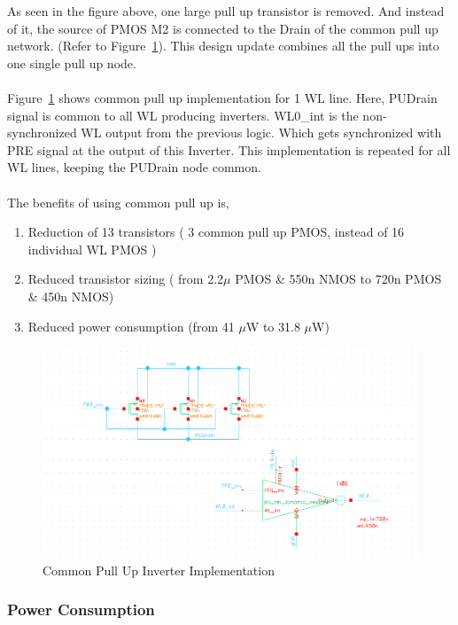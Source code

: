 \documentclass[10pt,letterpaper,onecolumn]{article}
\begin{document}
As seen in the figure above, one large pull up transistor is removed. And instead of it, the source of PMOS M2 is connected to the Drain of the common pull up network. (Refer to Figure~\ref{fig:RevDynamicCircuit}).  This design update combines all the pull ups into one single pull up node. \\ \\  Figure~\ref{fig:RevDynamicCircuit} shows common pull up implementation for 1 WL line. Here, PUDrain signal is common to all WL producing inverters. WL0\_int is the non-synchronized WL output from the previous logic. Which gets synchronized with PRE signal at the output of this Inverter. This implementation is repeated for all WL lines, keeping the PUDrain node common. \\ \\
The benefits of using common pull up is,
\begin{enumerate}
  \item Reduction of 13 transistors ( 3 common pull up PMOS, instead of 16 individual WL PMOS )  
  \item Reduced transistor sizing ( from 2.2$\mu$ PMOS \& 550n NMOS to 720n PMOS \& 450n NMOS)
  \item Reduced power consumption (from 41 $\mu$W to 31.8 $\mu$W) 
\end{enumerate}


\begin{figure}[h!]
\centering
\includegraphics[scale=0.6]{RevDynamicCircuit.png}
\caption{ Common Pull Up Inverter Implementation }
\label{fig:RevDynamicCircuit}
\end{figure}


\subsubsection{Power Consumption}
\end{document}
